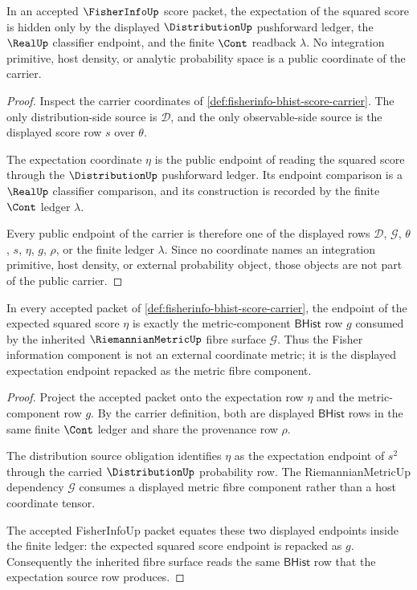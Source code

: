 \begin{theorem}
\label{thm:fisherinfo-expectation-ledger-exactness}
In an accepted $\FisherInfoUp$ score packet, the expectation of the squared
score is hidden only by the displayed $\DistributionUp$ pushforward ledger,
the $\RealUp$ classifier endpoint, and the finite $\Cont$ readback
$\lambda$. No integration primitive, host density, or analytic probability
space is a public coordinate of the carrier.
\end{theorem}
\begin{proof}
Inspect the carrier coordinates of
\autoref{def:fisherinfo-bhist-score-carrier}. The only distribution-side
source is $\mathcal{D}$, and the only observable-side source is the displayed
score row $s$ over $\theta$.

The expectation coordinate $\eta$ is the public endpoint of reading the
squared score through the $\DistributionUp$ pushforward ledger. Its endpoint
comparison is a $\RealUp$ classifier comparison, and its construction is
recorded by the finite $\Cont$ ledger $\lambda$.

Every public endpoint of the carrier is therefore one of the displayed rows
$\mathcal{D}$, $\mathcal{G}$, $\theta$, $s$, $\eta$, $g$, $\rho$, or the
finite ledger $\lambda$. Since no coordinate names an integration primitive,
host density, or external probability object, those objects are not part of
the public carrier.
\end{proof}

\begin{theorem}
\label{thm:fisherinfo-riemannian-metric-component-row}
In every accepted packet of
\autoref{def:fisherinfo-bhist-score-carrier}, the endpoint of the expected
squared score $\eta$ is exactly the metric-component $\mathsf{BHist}$ row
$g$ consumed by the inherited $\RiemannianMetricUp$ fibre surface
$\mathcal{G}$. Thus the Fisher information component is not an external
coordinate metric; it is the displayed expectation endpoint repacked as the
metric fibre component.
\end{theorem}
\begin{proof}
Project the accepted packet onto the expectation row $\eta$ and the
metric-component row $g$. By the carrier definition, both are displayed
$\mathsf{BHist}$ rows in the same finite $\Cont$ ledger and share the
provenance row $\rho$.

The distribution source obligation identifies $\eta$ as the expectation
endpoint of $s^2$ through the carried $\DistributionUp$ probability row. The
RiemannianMetricUp dependency $\mathcal{G}$ consumes a displayed metric fibre
component rather than a host coordinate tensor.

The accepted FisherInfoUp packet equates these two displayed endpoints inside
the finite ledger: the expected squared score endpoint is repacked as $g$.
Consequently the inherited fibre surface reads the same $\mathsf{BHist}$ row
that the expectation source row produces.
\end{proof}

